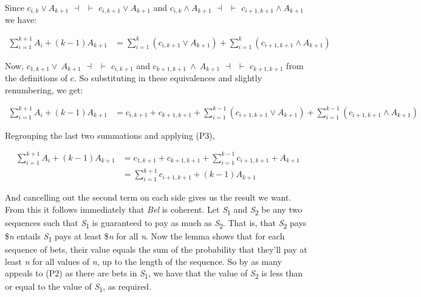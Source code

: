 \documentclass[
  11pt,
  letterpaper,
  DIV=11,
  numbers=noendperiod,
  oneside]{scrartcl}
\begin{document}
Since \(c_{i,k} \vee A_{k+1}\) \(\dashv\)~\(\vdash\)
\(c_{i,k+1} \vee A_{k+1}\) and \(c_{i,k} \wedge A_{k+1}\)
\(\dashv\)~\(\vdash\) \(c_{i+1,k+1} \wedge A_{k+1}\) we have:

\begin{figure*}

\[
\begin{aligned}
\sum_{i=1}^{k+1}A_i + (k-1)A_{k+1} &= \sum_{i=1}^{k}(c_{i,k+1} \vee A_{k+1}) + \sum_{i=1}^{k}(c_{i+1,k+1} \wedge A_{k+1})
\end{aligned}
\]

\end{figure*}%

Now, \(c_{1,k+1} \vee~ A_{k+1}\) \(\dashv\)~\(\vdash\) \(c_{i,k+1}\) and
\(c_{k+1,k+1} ~\wedge~ A_{k+1}\) \(\dashv\)~\(\vdash\) \(c_{k+1,k+1}\)
from the definitions of \(c\). So substituting in these equivalences and
slightly renumbering, we get:

\begin{figure*}

\[
\begin{aligned}
\sum_{i=1}^{k+1}A_i + (k-1)A_{k+1} &= c_{i,k+1} +c_{k+1,k+1} + \sum_{i=1}^{k-1}(c_{i+1,k+1} \vee A_{k+1}) + \sum_{i=1}^{k-1}(c_{i+1,k+1} \wedge A_{k+1})
\end{aligned}
\]

\end{figure*}%

Regrouping the last two summations and applying (P3),

\begin{figure*}

\[
\begin{aligned}
\sum_{i=1}^{k+1}A_i + (k-1)A_{k+1} &= c_{1,k+1} + c_{k+1,k+1} + \sum_{i=1}^{k-1}c_{i+1,k+1} + A_{k+1} \\
&= \sum_{i=1}^{k+1}c_{i+1,k+1} + (k-1)A_{k+1}
\end{aligned}
\]

\end{figure*}%

And cancelling out the second term on each side gives us the result we
want. From this it follows immediately that \emph{Bel} is coherent. Let
\emph{S}\textsubscript{1} and \emph{S}\textsubscript{2} be any two
sequences such that \emph{S}\textsubscript{1} is guaranteed to pay as
much as \emph{S}\textsubscript{2}. That is, that
\emph{S}\textsubscript{2} pays \$\emph{n} entails
\emph{S}\textsubscript{1} pays at least \$\emph{n} for all \emph{n}. Now
the lemma shows that for each sequence of bets, their value equals the
sum of the probability that they'll pay at least \emph{n} for all values
of \emph{n}, up to the length of the sequence. So by as many appeals to
(P2) as there are bets in \emph{S}\textsubscript{1}, we have that the
value of \emph{S}\textsubscript{2} is less than or equal to the value of
\emph{S}\textsubscript{1}, as required.
\end{document}

